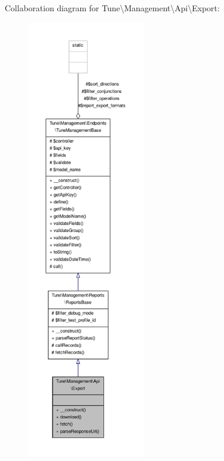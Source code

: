 Collaboration diagram for Tune\textbackslash{}Management\textbackslash{}Api\textbackslash{}Export\-:
\nopagebreak
\begin{figure}[H]
\begin{center}
\leavevmode
\includegraphics[height=550pt]{classTune_1_1Management_1_1Api_1_1Export__coll__graph}
\end{center}
\end{figure}
